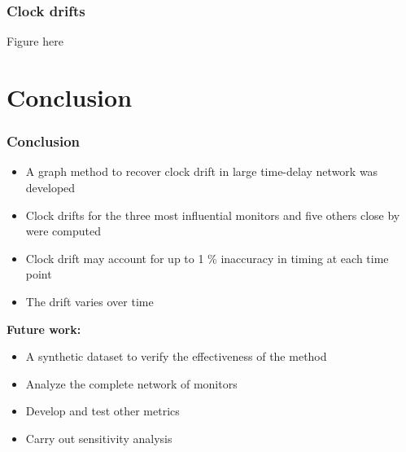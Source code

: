 \documentclass{beamer}
\begin{document}
 \begin{frame}
\frametitle{Clock drifts}
Figure here
\end{frame}

\section{Conclusion}
 \begin{frame}
\frametitle{Conclusion}
\begin{itemize}
\item A graph method to recover clock drift in large time-delay network was developed
\item Clock drifts for the three most influential monitors and five others close by were computed
\item Clock drift may account for up to 1 \% inaccuracy in timing at each time point
\item The drift varies over time
\end{itemize}
\vspace{0.5cm}
\textbf{\large{Future work:}}\normalsize 
\begin{itemize}
\item A synthetic dataset to verify the effectiveness of the method
\item Analyze the complete network of monitors
\item Develop and test other metrics
\item Carry out sensitivity analysis
\end{itemize}
\end{frame}
\end{document}
